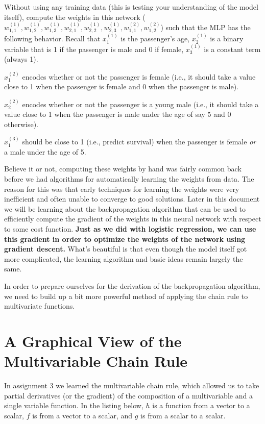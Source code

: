 \documentclass[assignment06_Solutions]{subfiles}
\begin{document}
\begin{exercise}
Without using any training data (this is testing your understanding of the model itself), compute the weights in this network ($w^{(1)}_{1,1}, w^{(1)}_{1,2}, w^{(1)}_{1,3}, w^{(1)}_{2,1}, w^{(1)}_{2,2}, w^{(1)}_{2,3}, w^{(2)}_{1,1}, w^{(2)}_{1,2}$) such that the MLP has the following behavior.  Recall that $x^{(1)}_1$ is the passenger's age, $x^{(1)}_2$ is a binary variable that is 1 if the passenger is male and 0 if female, $x^{(1)}_3$ is a constant term (always 1).
\bi
\item $x^{(2)}_1$ encodes whether or not the passenger is female (i.e., it should take a value close to 1 when the passenger is female and 0 when the passenger is male).
\item $x^{(2)}_2$ encodes whether or not the passenger is a young male (i.e., it should take a value close to 1 when the passenger is male under the age of say 5 and 0 otherwise).
\item $x^{(3)}_1$ should be close to 1 (i.e., predict survival) when the passenger is female \emph{or} a male under the age of 5.
\ei
\end{exercise}

Believe it or not, computing these weights by hand was fairly common back before we had algorithms for automatically learning the weights from data.  The reason for this was that early techniques for learning the weights were very inefficient and often unable to converge to good solutions.  Later in this document we will be learning about the backpropagation algorithm that can be used to efficiently compute the gradient of the weights in this neural network with respect to some cost function.  \textbf{Just as we did with logistic regression, we can use this gradient in order to optimize the weights of the network using gradient descent.}  What's beautiful is that even though the model itself got more complicated, the learning algorithm and basic ideas remain largely the same.

In order to prepare ourselves for the derivation of the backpropagation algorithm, we need to build up a bit more powerful method of applying the chain rule to multivariate functions.


\section{A Graphical View of the Multivariable Chain Rule}

In assignment 3 we learned the multivariable chain rule, which allowed us to take partial derivatives (or the gradient) of the composition of a multivariable and a single variable function.  In the listing below, $h$ is a function from a vector to a scalar, $f$ is from a vector to a scalar, and $g$ is from a scalar to a scalar.
\end{document}
